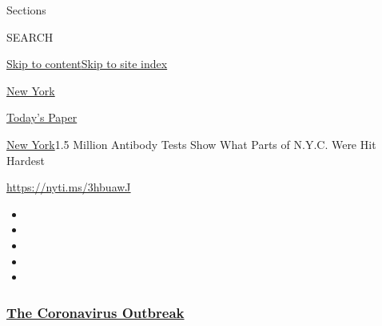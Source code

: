 Sections

SEARCH

\protect\hyperlink{site-content}{Skip to
content}\protect\hyperlink{site-index}{Skip to site index}

\href{https://www.nytimes3xbfgragh.onion/section/nyregion}{New York}

\href{https://myaccount.nytimes3xbfgragh.onion/auth/login?response_type=cookie\&client_id=vi}{}

\href{https://www.nytimes3xbfgragh.onion/section/todayspaper}{Today's
Paper}

\href{/section/nyregion}{New York}\textbar{}1.5 Million Antibody Tests
Show What Parts of N.Y.C. Were Hit Hardest

\url{https://nyti.ms/3hbuawJ}

\begin{itemize}
\item
\item
\item
\item
\item
\end{itemize}

\hypertarget{the-coronavirus-outbreak}{%
\subsubsection{\texorpdfstring{\href{https://www.nytimes3xbfgragh.onion/news-event/coronavirus?name=styln-coronavirus-national\&region=TOP_BANNER\&variant=undefined\&block=storyline_menu_recirc\&action=click\&pgtype=Article\&impression_id=0ac2cc50-e387-11ea-9f84-5f58ac2a67a1}{The
Coronavirus
Outbreak}}{The Coronavirus Outbreak}}\label{the-coronavirus-outbreak}}

